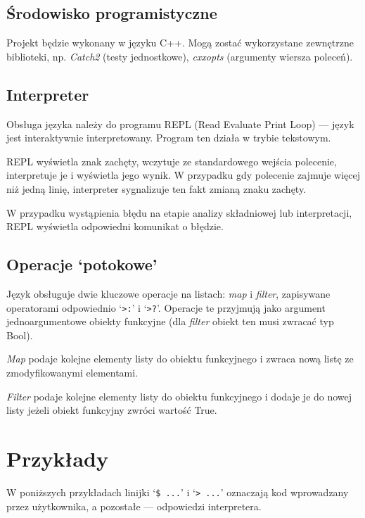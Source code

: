 \documentclass{article}
\begin{document}
\subsection{Środowisko programistyczne}
	Projekt będzie wykonany w języku C++. Mogą zostać wykorzystane zewnętrzne biblioteki, np. \textit{Catch2} (testy jednostkowe), \textit{cxxopts} (argumenty wiersza poleceń).

\subsection{Interpreter}
	Obsługa języka należy do programu REPL (Read Evaluate Print Loop) --- język jest interaktywnie interpretowany. Program ten działa w trybie tekstowym.

	REPL wyświetla znak zachęty, wczytuje ze standardowego wejścia polecenie, interpretuje je i wyświetla jego wynik. W przypadku gdy polecenie zajmuje więcej niż jedną linię, interpreter sygnalizuje ten fakt zmianą znaku zachęty.

	W przypadku wystąpienia błędu na etapie analizy składniowej lub interpretacji, REPL wyświetla odpowiedni komunikat o błędzie.
\subsection{Operacje `potokowe'}

	Język obsługuje dwie kluczowe operacje na listach: \textit{map} i \textit{filter}, zapisywane operatorami odpowiednio `\verb|>:|' i `\verb|>?|'.
	Operacje te przyjmują jako argument jednoargumentowe obiekty funkcyjne (dla \textit{filter} obiekt ten musi zwracać typ Bool).

\textit{Map} podaje kolejne elementy listy do obiektu funkcyjnego
i zwraca nową listę ze zmodyfikowanymi elementami.

\textit{Filter} podaje kolejne elementy listy do obiektu funkcyjnego
i dodaje je do nowej listy jeżeli obiekt funkcyjny zwróci wartość True.

\break
\section{Przykłady}
W poniższych przykładach linijki `\verb|$ ...|' i `\verb|> ...|'
oznaczają kod wprowadzany przez użytkownika, a pozostałe
--- odpowiedzi interpretera.
\end{document}
